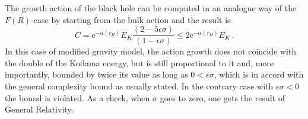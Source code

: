 \documentclass[ignorenonframetext,slidestop,compress]{beamer}
\begin{document}
\begin{frame}
 The growth action of the black hole can be computed in an analogue way of the $F(R)$-case by starting from the bulk action and the result is
\begin{equation*}
C=\text{e}^{-\alpha(r_H)}E_K\frac{(2-5\epsilon\sigma)}{(1-\epsilon\sigma)}\leq 2\text{e}^{-\alpha(r_H)}E_K\,.
\end{equation*}
In this case of modified gravity model, the action growth does not coincide with the double of the Kodama energy, but is still proportional
to it and, more importantly, bounded by twice its value as long as $0<\epsilon\sigma$, which is in accord with the general complexity bound as usually stated.  
In the contrary case with $\epsilon\sigma<0$ the bound is violated. 
As a check, when $\sigma $ goes to zero, one gets the result of General Relativity.
\end{frame}

\begin{frame}
 
\end{frame}

 
 
\end{document}
